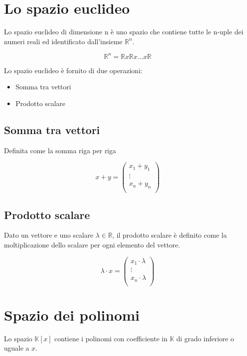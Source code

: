 \documentclass[a4paper, 10pt]{article}
\begin{document}
\section{Lo spazio euclideo}

Lo spazio euclideo di dimensione n è uno spazio che contiene tutte le n-uple dei numeri reali ed identificato dall'insieme $ \mathbb{R}^n $.

$$ \mathbb{R}^n = \mathbb{R} x \mathbb{R} x ... x \mathbb{R} $$

Lo spazio euclideo è fornito di due operazioni:

\begin{itemize}
	\item Somma tra vettori
	\item Prodotto scalare
\end{itemize}

\subsection{Somma tra vettori}
Definita come la somma riga per riga

$$ x+y=\left(\begin{matrix}x_1+y_1\\\vdots\\x_n+y_n\\\end{matrix}\right) $$

\subsection{Prodotto scalare}

Dato un vettore e uno scalare $ \lambda \in \mathbb{R} $, il prodotto scalare è definito come la moltiplicazione dello scalare per ogni elemento del vettore.

$$ \lambda \cdot x=\left(\begin{matrix}x_1\cdot\lambda\\\vdots\\x_n\cdot\lambda\\\end{matrix}\right) $$

\section{Spazio dei polinomi}

Lo spazio $ \mathbb{K}[x] $ contiene i polinomi con coefficiente in $\mathbb{K}$ di grado inferiore o uguale a $x$.
\end{document}

